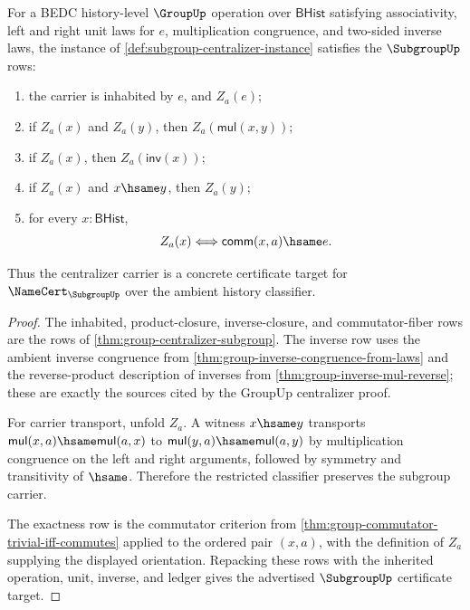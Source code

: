 \begin{theorem}
\label{thm:subgroup-centralizer-certificate-target}
For a BEDC history-level $\GroupUp$ operation over $\mathsf{BHist}$ satisfying
associativity, left and right unit laws for $e$, multiplication congruence, and
two-sided inverse laws, the instance of
\autoref{def:subgroup-centralizer-instance} satisfies the $\SubgroupUp$ rows:
\begin{enumerate}
\item the carrier is inhabited by $e$, and $Z_a(e)$;
\item if $Z_a(x)$ and $Z_a(y)$, then $Z_a(\mathsf{mul}(x,y))$;
\item if $Z_a(x)$, then $Z_a(\mathsf{inv}(x))$;
\item if $Z_a(x)$ and $x\hsame y$, then $Z_a(y)$;
\item for every $x:\mathsf{BHist}$,
$$
Z_a(x) \Longleftrightarrow \mathsf{comm}(x,a)\hsame e.
$$
\end{enumerate}
Thus the centralizer carrier is a concrete certificate target for
$\NameCert_{\SubgroupUp}$ over the ambient history classifier.
\end{theorem}
\begin{proof}
The inhabited, product-closure, inverse-closure, and commutator-fiber rows are
the rows of \autoref{thm:group-centralizer-subgroup}. The inverse row uses the
ambient inverse congruence from
\autoref{thm:group-inverse-congruence-from-laws} and the reverse-product
description of inverses from \autoref{thm:group-inverse-mul-reverse}; these
are exactly the sources cited by the GroupUp centralizer proof.

For carrier transport, unfold $Z_a$. A witness $x\hsame y$ transports
$\mathsf{mul}(x,a)\hsame\mathsf{mul}(a,x)$ to
$\mathsf{mul}(y,a)\hsame\mathsf{mul}(a,y)$ by multiplication congruence on the
left and right arguments, followed by symmetry and transitivity of $\hsame$.
Therefore the restricted classifier preserves the subgroup carrier.

The exactness row is the commutator criterion from
\autoref{thm:group-commutator-trivial-iff-commutes} applied to the ordered
pair $(x,a)$, with the definition of $Z_a$ supplying the displayed
orientation. Repacking these rows with the inherited operation, unit, inverse,
and ledger gives the advertised $\SubgroupUp$ certificate target.
\end{proof}

